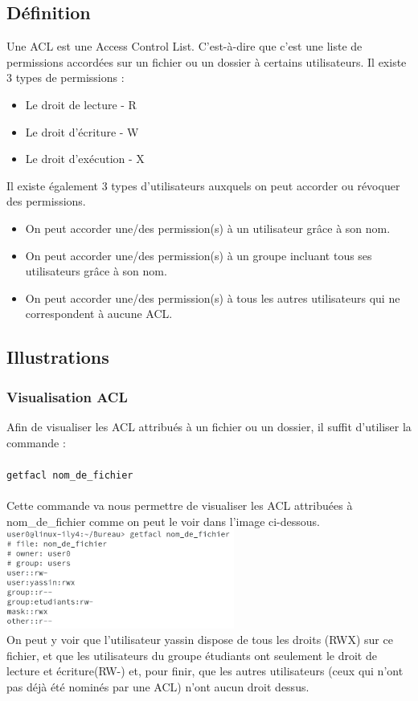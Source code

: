 \documentclass{article}
\begin{document}
\subsection{Définition}
Une ACL est une Access Control List. C'est-à-dire que c'est une liste de permissions accordées sur un fichier ou un dossier à certains utilisateurs. 
Il existe 3 types de permissions :
\begin{itemize}
\item Le droit de lecture - R
\item Le droit d'écriture - W
\item Le droit d'exécution - X
\end{itemize}
Il existe également 3 types d'utilisateurs auxquels on peut accorder ou révoquer des permissions.
\begin{itemize}
\item On peut accorder une/des permission(s) à un utilisateur grâce à son nom.
\item On peut accorder une/des permission(s) à un groupe incluant tous ses utilisateurs grâce à son nom.
\item On peut accorder une/des permission(s) à tous les autres utilisateurs qui ne correspondent à aucune ACL.
\end{itemize}
\newpage
\subsection{Illustrations}
\subsubsection{Visualisation ACL}

Afin de visualiser les ACL attribués à un fichier ou un dossier, il suffit d'utiliser la commande : \\\\
\texttt{getfacl  nom\_de\_fichier}\\\\
Cette commande va nous permettre de visualiser les ACL attribuées à nom\_de\_fichier comme on peut le voir dans l'image ci-dessous. \\
\includegraphics[width=7.5cm]{images/getfacl.png}\\
On peut y voir que l'utilisateur yassin dispose de tous les droits (RWX) sur ce fichier, et que les utilisateurs du groupe étudiants ont seulement le droit de lecture et écriture(RW-) et, pour finir, que les autres utilisateurs (ceux qui n'ont pas déjà été nominés par une ACL) n'ont aucun droit dessus.
\end{document}
